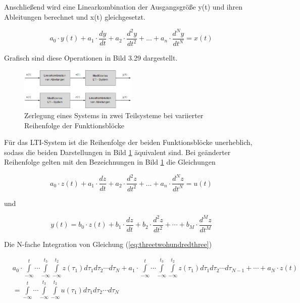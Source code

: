 \noindent Anschließend wird eine Linearkombination der Ausgangsgröße y(t) und ihren Ableitungen berechnet und x(t) gleichgesetzt.

\begin{equation}\label{eq:threetwohundredtwo}
a_{0}\cdot y(t) + a_{1}\cdot \frac{dy}{dt}+a_{2}\cdot \frac{d^2y}{dt^2}+ ... +a_{n}\cdot \frac{d^Ny}{dt^N} = x(t)
\end{equation}

\noindent Grafisch sind diese Operationen in Bild 3.29 dargestellt.

\begin{figure}[H]
  \centerline{\includegraphics[width=0.5\textwidth]{Kapitel2/Bilder/image29}}
  \caption{Zerlegung eines Systems in zwei Teilsysteme bei variierter Reihenfolge der Funktionsblöcke}
  \label{fig:Zerlegung}
\end{figure}

\noindent Für das LTI-System ist die Reihenfolge der beiden Funktionsblöcke unerheblich, sodass die beiden Darstellungen in Bild \ref{fig:Zerlegung} äquivalent sind. Bei geänderter Reihenfolge gelten mit den Bezeichnungen in Bild \ref{fig:Zerlegung}  die Gleichungen

\begin{equation}\label{eq:threetwohundredthree}
a_{0}\cdot z(t) + a_{1}\cdot \frac{dz}{dt}+a_{2}\cdot \frac{d^2z}{dt^2}+ ... +a_{n}\cdot \frac{d^Nz}{dt^N} = u(t)
\end{equation}

\noindent und

\begin{equation}\label{eq:threetwohundredfour}
y(t) = b_{0}\cdot z(t) + b_{1}\cdot \frac{dz}{dt} + b_{2}\cdot \frac{d^2z}{dt^2} + \cdots + b_{M}\cdot \frac{d^Mz}{dt^M} 
\end{equation}

\noindent Die N-fache Integration von Gleichung (\ref{eq:threetwohundredthree})

\begin{equation}\label{eq:threetwohundredfive}
\begin{split}
& a_{0}\cdot \int\limits _{-\infty }^{t} \cdots  \int\limits _{-\infty }^{t_{3}}  \int\limits _{-\infty }^{t_{2}} z(\tau _{1}) d\tau _{1} d\tau _{2} \cdots d\tau _{N} + a_{1}\cdot \int\limits _{-\infty }^{t} \cdots  \int\limits _{-\infty }^{t_{3}}  \int\limits _{-\infty }^{t_{2}} z(\tau _{1}) d\tau _{1} d\tau _{2} \cdots d\tau _{N-1} + \cdots + a_{N} \cdot z(t)\\ 
& = \int\limits _{-\infty }^{t} \cdots  \int\limits _{-\infty }^{t_{3}} \int\limits _{-\infty }^{t_{2}} u(\tau _{1}) d\tau _{1} d\tau _{2} \cdots d\tau _{N}     
\end{split}
\end{equation}

